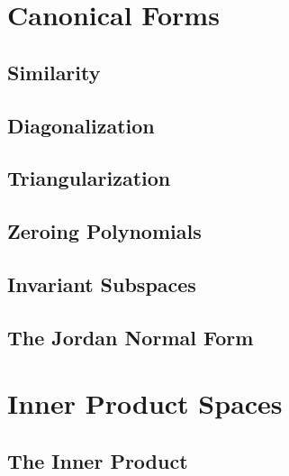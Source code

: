 \documentclass[10pt]{article}
\begin{document}
\newpage
\section{Canonical Forms}

\subsection{Similarity}



\subsection{Diagonalization}



\subsection{Triangularization}



\subsection{Zeroing Polynomials}



\subsection{Invariant Subspaces}



\subsection{The Jordan Normal Form}



\newpage

\section{Inner Product Spaces}

\subsection{The Inner Product}


\end{document}
